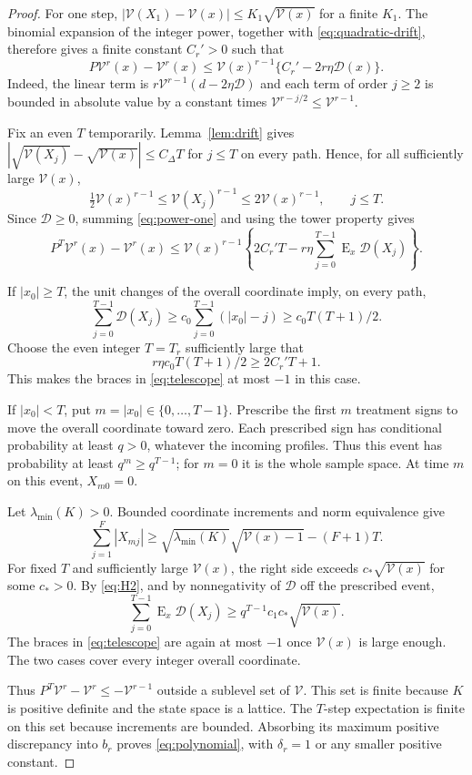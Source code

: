 \documentclass[12pt,a4paper]{article}
\theoremstyle{definition}
\theoremstyle{remark}\newtheorem{remark}{Remark}
\numberwithin{equation}{section}
\newcommand{\E}{\operatorname{E}}
\begin{document}
\begin{proof}
For one step, $|\mathcal V(X_1)-\mathcal V(x)|\le K_1\sqrt{\mathcal V(x)}$ for a finite $K_1$. The binomial expansion of the integer power, together with \eqref{eq:quadratic-drift}, therefore gives a finite constant $C_r'>0$ such that
\begin{equation}\label{eq:power-one}
 P\mathcal V^r(x)-\mathcal V^r(x)
 \le \mathcal V(x)^{r-1}\{C_r'-2r\eta \mathcal D(x)\}.
\end{equation}
Indeed, the linear term is $r\mathcal V^{r-1}(d-2\eta \mathcal D)$ and each term of order $j\ge2$ is bounded in absolute value by a constant times $\mathcal V^{r-j/2}\le \mathcal V^{r-1}$.

Fix an even $T$ temporarily. Lemma~\ref{lem:drift} gives
$|\sqrt{\mathcal V(X_j)}-\sqrt{\mathcal V(x)}|\le C_\Delta T$ for $j\le T$ on every path. Hence, for all sufficiently large $\mathcal V(x)$,
\[
 \tfrac12\mathcal V(x)^{r-1}\le \mathcal V(X_j)^{r-1}\le 2\mathcal V(x)^{r-1},\qquad j\le T.
\]
Since $\mathcal D\ge0$, summing \eqref{eq:power-one} and using the tower property gives
\begin{equation}\label{eq:telescope}
 P^T\mathcal V^r(x)-\mathcal V^r(x)
 \le \mathcal V(x)^{r-1}\left\{2C_r'T-r\eta\sum_{j=0}^{T-1}\E_x\mathcal D(X_j)\right\}.
\end{equation}

If $|x_0|\ge T$, the unit changes of the overall coordinate imply, on every path,
\[
 \sum_{j=0}^{T-1}\mathcal D(X_j)\ge c_0\sum_{j=0}^{T-1}(|x_0|-j)
 \ge c_0T(T+1)/2.
\]
Choose the even integer $T=T_r$ sufficiently large that
\[
 r\eta c_0T(T+1)/2\ge 2C_r'T+1.
\]
This makes the braces in \eqref{eq:telescope} at most $-1$ in this case.

If $|x_0|<T$, put $m=|x_0|\in\{0,\ldots,T-1\}$. Prescribe the first $m$ treatment signs to move the overall coordinate toward zero. Each prescribed sign has conditional probability at least $q>0$, whatever the incoming profiles. Thus this event has probability at least $q^m\ge q^{T-1}$; for $m=0$ it is the whole sample space. At time $m$ on this event, $X_{m0}=0$.

Let $\lambda_{\min}(K)>0$. Bounded coordinate increments and norm equivalence give
\[
 \sum_{j=1}^F|X_{mj}|
 \ge\sqrt{\lambda_{\min}(K)}\sqrt{\mathcal V(x)-1}-(F+1)T.
\]
For fixed $T$ and sufficiently large $\mathcal V(x)$, the right side exceeds $c_*\sqrt{\mathcal V(x)}$ for some $c_*>0$. By \eqref{eq:H2}, and by nonnegativity of $\mathcal D$ off the prescribed event,
\[
 \sum_{j=0}^{T-1}\E_x\mathcal D(X_j)
 \ge q^{T-1}c_1c_*\sqrt{\mathcal V(x)}.
\]
The braces in \eqref{eq:telescope} are again at most $-1$ once $\mathcal V(x)$ is large enough. The two cases cover every integer overall coordinate.

Thus $P^T\mathcal V^r-\mathcal V^r\le -\mathcal V^{r-1}$ outside a sublevel set of $\mathcal V$. This set is finite because $K$ is positive definite and the state space is a lattice. The $T$-step expectation is finite on this set because increments are bounded. Absorbing its maximum positive discrepancy into $b_r$ proves \eqref{eq:polynomial}, with $\delta_r=1$ or any smaller positive constant.
\end{proof}
\end{document}
